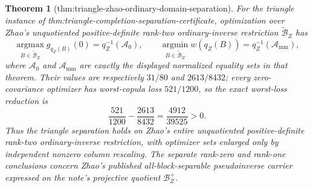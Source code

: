 \documentclass{article}
\newtheorem{theorem}{Theorem}
\begin{document}
\begin{theorem}[thm:triangle-zhao-ordinary-domain-separation]\label{thm:triangle-zhao-ordinary-domain-separation}
For the triangle instance of thm:triangle-completion-separation-certificate, optimization over Zhao's unquotiented positive-definite rank-two ordinary-inverse restriction \(\widetilde{\mathcal B}_Z\) has
\[
\operatorname*{argmax}_{B\in\widetilde{\mathcal B}_Z}g_{q_Z(B)}(0)=q_Z^{-1}(\mathcal A_0),
\qquad
\operatorname*{argmin}_{B\in\widetilde{\mathcal B}_Z}w(q_Z(B))=q_Z^{-1}(\mathcal A_{\mathrm{mm}}),
\]
where \(\mathcal A_0\) and \(\mathcal A_{\mathrm{mm}}\) are exactly the displayed normalized equality sets in that theorem.  Their values are respectively \(31/80\) and \(2613/8432\); every zero-covariance optimizer has worst-copula loss \(521/1200\), so the exact worst-loss reduction is
\[
\frac{521}{1200}-\frac{2613}{8432}=\frac{4912}{39525}>0.
\]
Thus the triangle separation holds on Zhao's entire unquotiented positive-definite rank-two ordinary-inverse restriction, with optimizer sets enlarged only by independent nonzero column rescaling.  The separate rank-zero and rank-one conclusions concern Zhao's published all-block-separable pseudoinverse carrier expressed on the note's projective quotient \(\mathcal B_Z^+\).
\end{theorem}
\end{document}
